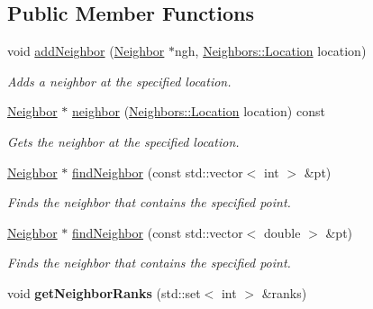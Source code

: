 \subsection*{Public Member Functions}
\begin{DoxyCompactItemize}
\item 
\hypertarget{classrepast_1_1_neighbors_acebe1c38c1b9a6492c2bd819aa315640}{void \hyperlink{classrepast_1_1_neighbors_acebe1c38c1b9a6492c2bd819aa315640}{add\-Neighbor} (\hyperlink{classrepast_1_1_neighbor}{Neighbor} $\ast$ngh, \hyperlink{classrepast_1_1_neighbors_a7a695a73b614b849f12fd943329b8bdc}{Neighbors\-::\-Location} location)}\label{classrepast_1_1_neighbors_acebe1c38c1b9a6492c2bd819aa315640}

\begin{DoxyCompactList}\small\item\em Adds a neighbor at the specified location. \end{DoxyCompactList}\item 
\hyperlink{classrepast_1_1_neighbor}{Neighbor} $\ast$ \hyperlink{classrepast_1_1_neighbors_adbcad09f1909177b08c195f64b818c85}{neighbor} (\hyperlink{classrepast_1_1_neighbors_a7a695a73b614b849f12fd943329b8bdc}{Neighbors\-::\-Location} location) const 
\begin{DoxyCompactList}\small\item\em Gets the neighbor at the specified location. \end{DoxyCompactList}\item 
\hyperlink{classrepast_1_1_neighbor}{Neighbor} $\ast$ \hyperlink{classrepast_1_1_neighbors_a745a848c9e0bdc4270dca7cb7d232259}{find\-Neighbor} (const std\-::vector$<$ int $>$ \&pt)
\begin{DoxyCompactList}\small\item\em Finds the neighbor that contains the specified point. \end{DoxyCompactList}\item 
\hyperlink{classrepast_1_1_neighbor}{Neighbor} $\ast$ \hyperlink{classrepast_1_1_neighbors_a6ce8456088582c39eb99d9497e2f4ea0}{find\-Neighbor} (const std\-::vector$<$ double $>$ \&pt)
\begin{DoxyCompactList}\small\item\em Finds the neighbor that contains the specified point. \end{DoxyCompactList}\item 
\hypertarget{classrepast_1_1_neighbors_a51169973f80e7b98147aefd15a217fa9}{void {\bfseries get\-Neighbor\-Ranks} (std\-::set$<$ int $>$ \&ranks)}\label{classrepast_1_1_neighbors_a51169973f80e7b98147aefd15a217fa9}

\end{DoxyCompactItemize}
